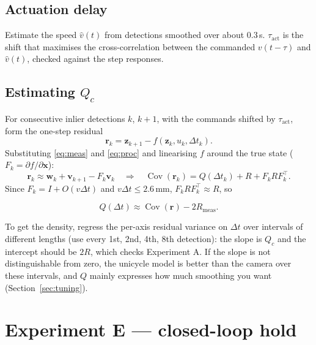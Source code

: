 \documentclass[11pt,a4paper]{article}
\newcommand{\Cov}{\operatorname{Cov}}
\begin{document}
\subsection{Actuation delay}
Estimate the speed $\hat v(t)$ from detections smoothed over about 0.3\,s.
$\tau_\text{act}$ is the shift that maximises the cross-correlation between
the commanded $v(t-\tau)$ and $\hat v(t)$, checked against the step responses.

\subsection{Estimating \texorpdfstring{$Q_c$}{Qc}}
For consecutive inlier detections $k$, $k+1$, with the commands shifted by
$\tau_\text{act}$, form the one-step residual
\begin{equation}
  \bm{r}_k=\bm{z}_{k+1}-f(\bm{z}_k,u_{k},\Delta t_k).
\end{equation}
Substituting \eqref{eq:meas} and \eqref{eq:proc} and linearising $f$
around the true state ($F_k=\partial f/\partial\bm{x}$):
\begin{equation}
  \bm{r}_k \approx \bm{w}_k + \bm{v}_{k+1} - F_k\bm{v}_k
  \quad\Rightarrow\quad
  \Cov(\bm{r}_k)=Q(\Delta t_k)+R+F_kRF_k^\top .
\end{equation}
Since $F_k=I+O(v\Delta t)$ and $v\Delta t\le 2.6$\,mm, $F_kRF_k^\top\approx R$, so
\begin{mathbox}
\begin{equation}
  Q(\Delta t)\approx\Cov(\bm{r})-2R_\text{meas}.
\end{equation}
\end{mathbox}
To get the density, regress the per-axis residual variance on $\Delta t$
over intervals of different lengths (use every 1st, 2nd, 4th, 8th
detection): the slope is $Q_c$ and the intercept should be $2R$, which
checks Experiment A. If the slope is not distinguishable from zero, the
unicycle model is better than the camera over these intervals, and $Q$
mainly expresses how much smoothing you want (Section~\ref{sec:tuning}).

\section{Experiment E --- closed-loop hold}
\label{sec:closedloop}
\end{document}
